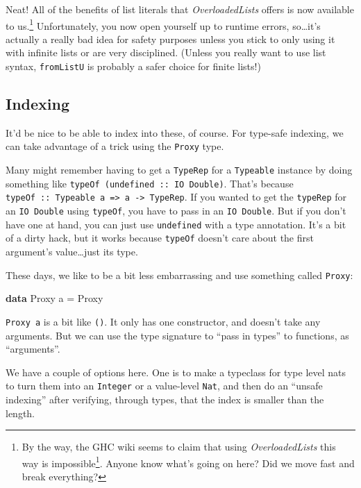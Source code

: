 \documentclass[]{article}
\newenvironment{Shaded}{}{}
\newcommand{\DataTypeTok}[1]{\textcolor[rgb]{0.56,0.13,0.00}{#1}}
\newcommand{\KeywordTok}[1]{\textcolor[rgb]{0.00,0.44,0.13}{\textbf{#1}}}
\newcommand{\NormalTok}[1]{#1}
\newcommand{\OtherTok}[1]{\textcolor[rgb]{0.00,0.44,0.13}{#1}}
\renewcommand{\href}[2]{#2\footnote{\url{#1}}}
\begin{document}
Neat! All of the benefits of list literals that \emph{OverloadedLists} offers is
now available to us.\footnote{By the way, the GHC wiki seems to claim that
  \href{https://ghc.haskell.org/trac/ghc/wiki/OverloadedLists\#Length-indexedobservedVectors}{using
  \emph{OverloadedLists} this way is impossible}. Anyone know what's going on
  here? Did we move fast and break everything?} Unfortunately, you now open
yourself up to runtime errors, so\ldots it's actually a really bad idea for
safety purposes unless you stick to only using it with infinite lists or are
very disciplined. (Unless you really want to use list syntax, \texttt{fromListU}
is probably a safer choice for finite lists!)

\subsection{Indexing}\label{indexing}

It'd be nice to be able to index into these, of course. For type-safe indexing,
we can take advantage of a trick using the \texttt{Proxy} type.

Many might remember having to get a \texttt{TypeRep} for a \texttt{Typeable}
instance by doing something like \texttt{typeOf\ (undefined\ ::\ IO\ Double)}.
That's because
\texttt{typeOf\ ::\ Typeable\ a\ =\textgreater{}\ a\ -\textgreater{}\ TypeRep}.
If you wanted to get the \texttt{typeRep} for an \texttt{IO\ Double} using
\texttt{typeOf}, you have to pass in an \texttt{IO\ Double}. But if you don't
have one at hand, you can just use \texttt{undefined} with a type annotation.
It's a bit of a dirty hack, but it works because \texttt{typeOf} doesn't care
about the first argument's value\ldots just its type.

These days, we like to be a bit less embarrassing and use something called
\texttt{Proxy}:

\begin{Shaded}
\begin{Highlighting}[]
\KeywordTok{data} \DataTypeTok{Proxy}\NormalTok{ a }\OtherTok{=} \DataTypeTok{Proxy}
\end{Highlighting}
\end{Shaded}

\texttt{Proxy\ a} is a bit like \texttt{()}. It only has one constructor, and
doesn't take any arguments. But we can use the type signature to ``pass in
types'' to functions, as ``arguments''.

We have a couple of options here. One is to make a typeclass for type level nats
to turn them into an \texttt{Integer} or a value-level \texttt{Nat}, and then do
an ``unsafe indexing'' after verifying, through types, that the index is smaller
than the length.
\end{document}
